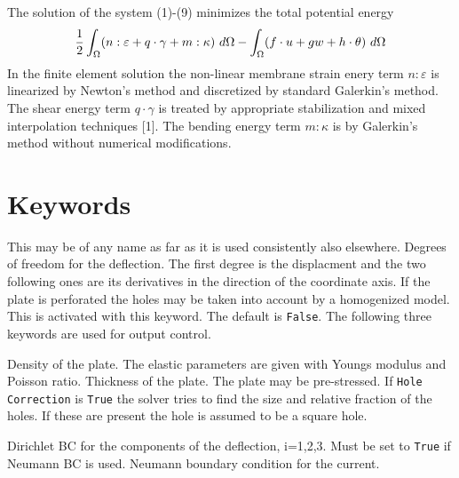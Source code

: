 \begin{versiona}
The solution of the system (1)-(9) minimizes the total potential energy
\begin{equation}
{1\over 2}\int_\Omega (n:\varepsilon + q\cdot\gamma + m:\kappa ) \ d\Omega
- \int_\Omega (f\cdot u + gw + h\cdot\theta) \ d\Omega
\end{equation}
In the finite element solution the non-linear membrane strain enery
term $n:\varepsilon$ is linearized by Newton's method and discretized
by standard Galerkin's method. The shear energy term $q\cdot\gamma$ is
treated by appropriate stabilization and mixed interpolation techniques [1].
The bending energy term $m:\kappa$ is by Galerkin's method without numerical
modifications.

\end{versiona}

\section{Keywords}

\sifbegin
{}
\sifbegin
{}
This may be of any name as far as it is used consistently also elsewhere.
Degrees of freedom for the deflection. 
The first degree is the displacment and the two following ones
are its derivatives in the direction of the coordinate axis.
If the plate is perforated the holes may be taken into account by 
a homogenized model. This is activated with this keyword.
The default is \texttt{False}.
The following three keywords are used for output control.
\sifend

\sifbegin
{}
Density of the plate.
The elastic parameters are given with Youngs modulus and Poisson ratio.
Thickness of the plate.
The plate may be pre-stressed.
If \texttt{Hole Correction} is \texttt{True} the solver 
tries to find the size and relative fraction of the holes. 
If these are present the hole is assumed to be a square hole.
\sifend

\sifbegin
{}
Dirichlet BC for the components of the deflection, i=1,2,3.
Must be set to {\tt True} if Neumann BC is used.
Neumann boundary condition for the current.
\sifend


